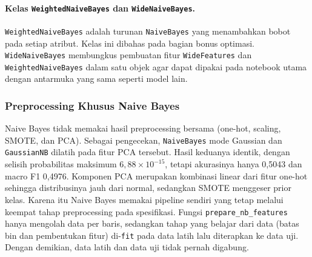 \paragraph{Kelas \texttt{WeightedNaiveBayes} dan \texttt{WideNaiveBayes}.}
\texttt{WeightedNaiveBayes} adalah turunan \texttt{NaiveBayes} yang menambahkan
bobot pada setiap atribut. Kelas ini dibahas pada bagian bonus optimasi.
\texttt{WideNaiveBayes} membungkus pembuatan fitur \texttt{WideFeatures} dan
\texttt{WeightedNaiveBayes} dalam satu objek agar dapat dipakai pada
notebook utama dengan antarmuka yang sama seperti model lain.

\subsubsection{Preprocessing Khusus Naive Bayes}
Naive Bayes tidak memakai hasil preprocessing bersama (one-hot, scaling, SMOTE,
dan PCA). Sebagai pengecekan, \texttt{NaiveBayes} mode Gaussian dan
\texttt{GaussianNB} dilatih pada fitur PCA tersebut. Hasil keduanya identik,
dengan selisih probabilitas maksimum $6{,}88\times10^{-15}$, tetapi akurasinya
hanya 0,5043 dan macro F1 0,4976. Komponen PCA merupakan kombinasi linear dari
fitur one-hot sehingga distribusinya jauh dari normal, sedangkan SMOTE menggeser
prior kelas. Karena itu Naive Bayes memakai pipeline sendiri yang tetap melalui
keempat tahap preprocessing pada spesifikasi.
Fungsi \texttt{prepare\_nb\_features} hanya mengolah data per baris, sedangkan
tahap yang belajar dari data (batas bin dan pembentukan fitur) di-\texttt{fit}
pada data latih lalu diterapkan ke data uji. Dengan demikian, data latih dan data
uji tidak pernah digabung.

